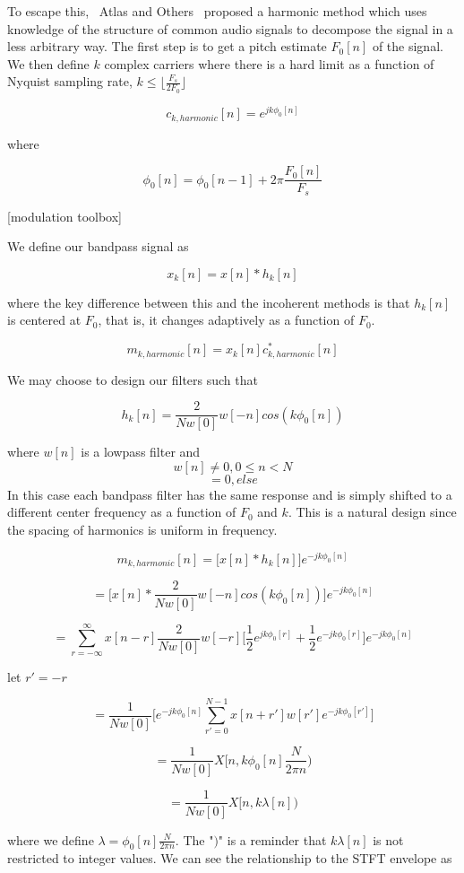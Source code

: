 \documentclass [11pt, proquest] {uwthesis}[2015/03/03]
\begin{document}
To escape this, ~Atlas and Others~ proposed a harmonic method which uses knowledge of the structure of common audio signals to decompose the signal in a less arbitrary way.  The first step is to get a pitch estimate $F_0[n]$ of the signal.  We then define $k$ complex carriers where there is a hard limit as a function of Nyquist sampling rate, $k \leq  \lfloor \frac{F_s}{2F_0} \rfloor$

$$c_{k,harmonic}[n] = e^{jk\phi_0 [n]}$$

where 

$$\phi_0[n] = \phi_0[n - 1] + 2\pi \frac{F_0[n]}{F_s}$$

[modulation toolbox]

We define our bandpass signal as 

$$x_k[n] = x[n] * h_k[n]$$

where the key difference between this and the incoherent methods is that $h_k[n]$ is centered at $F_0$, that is, it changes adaptively as a function of $F_0$.

$$m_{k,harmonic}[n] = x_k[n] c_{k,harmonic}^*[n] $$

We may choose to design our filters such that

$$h_k[n] = \frac{2}{Nw[0]} w[-n] cos( k \phi_0[n])$$

where $w[n]$ is a lowpass filter and 
$$w[n] \neq 0, 0 \leq n < N$$
$$ = 0, else$$
In this case each bandpass filter has the same response and is simply shifted to a different center frequency as a function of $F_0$ and $k$.  This is a natural design since the spacing of harmonics is uniform in frequency.


$$m_{k,harmonic}[n] = \bigg[ x[n] * h_k[n] \bigg] e^{-jk \phi_0[n]}$$


$$= \bigg[ x[n] * \frac{2}{Nw[0]}w[-n] cos( k \phi_0[n]) \bigg] e^{-jk \phi_0[n]}$$

$$= \sum_{r = -\infty}^\infty x[n - r] \frac{2}{Nw[0]}w[-r] \bigg[ \frac{1}{2} e^{jk \phi_0[r]} + \frac{1}{2} e^{-jk \phi_0[r]} \bigg] e^{-jk \phi_0[n]}$$

let $r' = -r$

$$= \frac{1}{Nw[0]} \bigg[ e^{-jk \phi_0[n]} \sum_{r' = 0}^{N-1} x[n + r'] w[r'] e^{-jk \phi_0[r']} \bigg]$$

$$= \frac{1}{Nw[0]} X[n, k \phi_0[n] \frac{N}{2\pi n})$$

$$= \frac{1}{Nw[0]} X[n, k\lambda[n])$$

where we define $\lambda = \phi_0[n] \frac{N}{2\pi n}$.  The "$)$" is a reminder that $k\lambda [n]$ is not restricted to integer values.  We can see the relationship to the STFT envelope as
\end{document}
